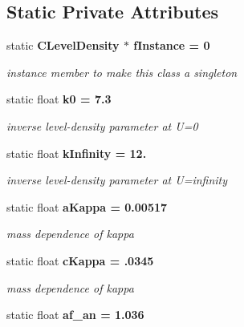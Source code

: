 \subsection*{Static Private Attributes}
\begin{CompactItemize}
\item 
static \bf{CLevel\-Density} $\ast$ \bf{f\-Instance} = 0\label{classCLevelDensity_cd22bebf963abe34264ebd60b30f35e8}

\begin{CompactList}\small\item\em instance member to make this class a singleton \item\end{CompactList}\item 
static float \bf{k0} = 7.3\label{classCLevelDensity_2d81b36293e089d0ea9e207eb92f9839}

\begin{CompactList}\small\item\em inverse level-density parameter at U=0 \item\end{CompactList}\item 
static float \bf{k\-Infinity} = 12.\label{classCLevelDensity_7e962db0e85758cc3aa150bd33c7df56}

\begin{CompactList}\small\item\em inverse level-density parameter at U=infinity \item\end{CompactList}\item 
static float \bf{a\-Kappa} = 0.00517\label{classCLevelDensity_8aec4ef16f0210c7a75133707685b308}

\begin{CompactList}\small\item\em mass dependence of kappa \item\end{CompactList}\item 
static float \bf{c\-Kappa} = .0345\label{classCLevelDensity_dd31aa8f8f306f10f6f05e1baa4e5714}

\begin{CompactList}\small\item\em mass dependence of kappa \item\end{CompactList}\item 
static float \bf{af\_\-an} = 1.036\label{classCLevelDensity_2c9546a639a3bf40c0dbb6114bc0338b}


\end{CompactItemize}
